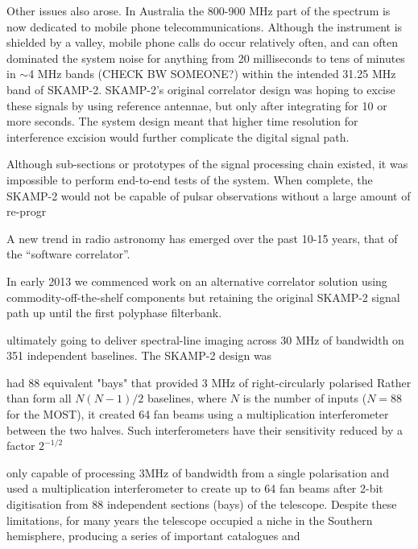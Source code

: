 Other issues also arose. In Australia the 800-900 MHz part of the spectrum is now dedicated to mobile phone telecommunications. Although the instrument is shielded by a valley, mobile phone calls do occur relatively often, and can often dominated the system noise for anything from 20 milliseconds to tens of minutes in $\sim$4 MHz bands (CHECK BW SOMEONE?) within the intended 31.25 MHz band of SKAMP-2. SKAMP-2's original correlator design was hoping to excise these signals by using reference antennae, but only after integrating for 10 or more seconds. The system design meant that higher time resolution for interference excision would further complicate the digital signal path. 

Although sub-sections or prototypes of the signal processing chain existed, it was impossible to perform end-to-end tests of the system. When complete, the SKAMP-2 would not be capable of pulsar observations without a large amount of re-progr

A new trend in radio astronomy has emerged over the past 10-15 years, that of the ``software correlator''. 

In early 2013 we commenced work on an alternative correlator solution using commodity-off-the-shelf components but retaining the original SKAMP-2 signal path up until the first polyphase filterbank. 

ultimately going to deliver spectral-line imaging across 30 MHz of bandwidth on 351 independent baselines\cite{Adams_2004}. The SKAMP-2 design was 


had 88 equivalent "bays" that provided 3 MHz of right-circularly polarised Rather than form all $N(N-1)/2$ baselines, where $N$ is the number of inputs ($N=88$ for the MOST), it created 64 fan beams using a multiplication interferometer between the two halves. Such interferometers have their sensitivity reduced by a factor $2^{-1/2}$ 

only capable of processing 3MHz of bandwidth from a single polarisation and used a multiplication interferometer to create up to 64 fan beams after 2-bit digitisation from 88 independent sections (bays) of the telescope. Despite these limitations, for many years the telescope occupied a niche in the Southern hemisphere, producing a series of important catalogues and  

